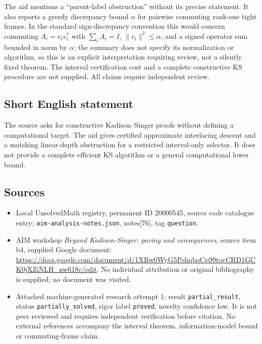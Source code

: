 \documentclass[11pt]{article}
\begin{document}
The aid mentions a ``parent-label obstruction'' without its precise statement. It also reports a greedy discrepancy bound $\alpha$ for pairwise commuting rank-one tight frames. In the standard sign-discrepancy convention this would concern commuting $A_i=v_iv_i^*$ with $\sum_iA_i=I$, $\|v_i\|^2\le\alpha$, and a signed operator sum bounded in norm by $\alpha$; the summary does not specify its normalization or algorithm, so this is an explicit interpretation requiring review, not a silently fixed theorem. The interval certification cost and a complete constructive KS procedure are not supplied. All claims require independent review.
\subsection{Short English statement}
The source asks for constructive Kadison--Singer proofs without defining a computational target. The aid gives certified approximate interlacing descent and a matching linear-depth obstruction for a restricted interval-only selector. It does not provide a complete efficient KS algorithm or a general computational lower bound.
\subsection{Sources}
\begin{itemize}
\item Local UnsolvedMath registry, permanent ID 20000545, source code catalogue entry; \texttt{aim-analysis-notes.json}, notes[76], tag \texttt{question}.
\item AIM workshop \emph{Beyond Kadison-Singer: paving and consequences}, source item b4, supplied Google document: \url{https://docs.google.com/document/d/1XRw0WyG5PshqboCp99tovCRD1GCK0jXZiNLH_nw618c/edit}. No individual attribution or original bibliography is supplied; no document was visited.
\item Attached machine-generated research attempt 1: result \texttt{partial\_result}, status \texttt{partially\_solved}, rigor label \texttt{proved}, novelty confidence low. It is not peer reviewed and requires independent verification before citation. No external references accompany the interval theorem, information-model bound or commuting-frame claim.
\end{itemize}
\end{document}
